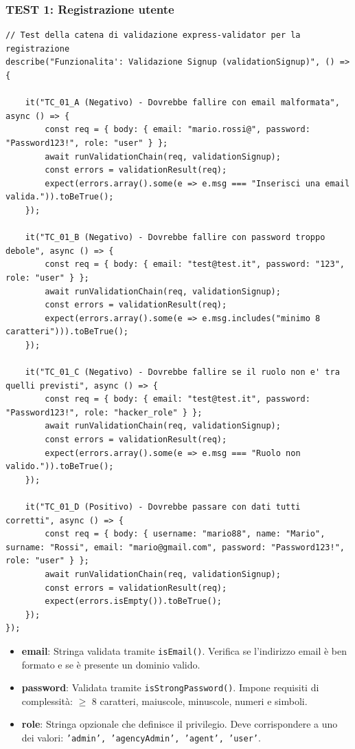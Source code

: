 \documentclass{article}
\begin{document}
\subsubsection{TEST 1: Registrazione utente}

\begin{lstlisting}[caption=Unit Test della validazione signup (validationSignup)]
// Test della catena di validazione express-validator per la registrazione
describe("Funzionalita': Validazione Signup (validationSignup)", () => {
    
    it("TC_01_A (Negativo) - Dovrebbe fallire con email malformata", async () => {
        const req = { body: { email: "mario.rossi@", password: "Password123!", role: "user" } };
        await runValidationChain(req, validationSignup);
        const errors = validationResult(req);
        expect(errors.array().some(e => e.msg === "Inserisci una email valida.")).toBeTrue();
    });

    it("TC_01_B (Negativo) - Dovrebbe fallire con password troppo debole", async () => {
        const req = { body: { email: "test@test.it", password: "123", role: "user" } };
        await runValidationChain(req, validationSignup);
        const errors = validationResult(req);
        expect(errors.array().some(e => e.msg.includes("minimo 8 caratteri"))).toBeTrue();
    });

    it("TC_01_C (Negativo) - Dovrebbe fallire se il ruolo non e' tra quelli previsti", async () => {
        const req = { body: { email: "test@test.it", password: "Password123!", role: "hacker_role" } };
        await runValidationChain(req, validationSignup);
        const errors = validationResult(req);
        expect(errors.array().some(e => e.msg === "Ruolo non valido.")).toBeTrue();
    });

    it("TC_01_D (Positivo) - Dovrebbe passare con dati tutti corretti", async () => {
        const req = { body: { username: "mario88", name: "Mario", surname: "Rossi", email: "mario@gmail.com", password: "Password123!", role: "user" } };
        await runValidationChain(req, validationSignup);
        const errors = validationResult(req);
        expect(errors.isEmpty()).toBeTrue();
    });
});
\end{lstlisting}

\begin{itemize}
    \item \textbf{email}: Stringa validata tramite \texttt{isEmail()}. Verifica se l'indirizzo email è ben formato e se è presente un dominio valido.
    \item \textbf{password}: Validata tramite \texttt{isStrongPassword()}. Impone requisiti di complessità: $\ge$ 8 caratteri, maiuscole, minuscole, numeri e simboli.
    \item \textbf{role}: Stringa opzionale che definisce il privilegio. Deve corrispondere a uno dei valori: \texttt{'admin', 'agencyAdmin', 'agent', 'user'}.
\end{itemize}
\end{document}
